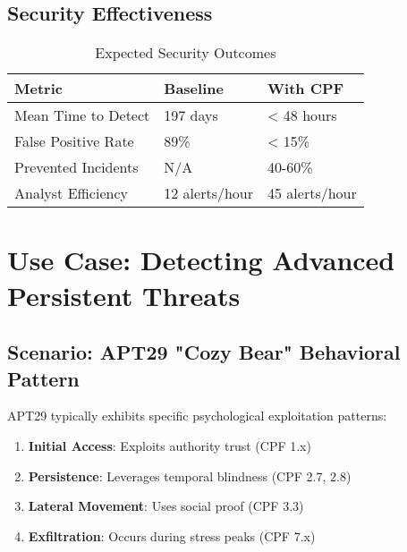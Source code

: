 \documentclass[11pt,a4paper]{article}
\begin{document}
\subsection{Security Effectiveness}

\begin{table}[H]
\centering
\caption{Expected Security Outcomes}
\begin{tabular}{lll}
\toprule
Metric & Baseline & With CPF \\
\midrule
Mean Time to Detect & 197 days & < 48 hours \\
False Positive Rate & 89\% & < 15\% \\
Prevented Incidents & N/A & 40-60\% \\
Analyst Efficiency & 12 alerts/hour & 45 alerts/hour \\
\bottomrule
\end{tabular}
\end{table}

\section{Use Case: Detecting Advanced Persistent Threats}

\subsection{Scenario: APT29 "Cozy Bear" Behavioral Pattern}

APT29 typically exhibits specific psychological exploitation patterns:

\begin{enumerate}
\item \textbf{Initial Access}: Exploits authority trust (CPF 1.x)
\item \textbf{Persistence}: Leverages temporal blindness (CPF 2.7, 2.8)
\item \textbf{Lateral Movement}: Uses social proof (CPF 3.3)
\item \textbf{Exfiltration}: Occurs during stress peaks (CPF 7.x)
\end{enumerate}
\end{document}
